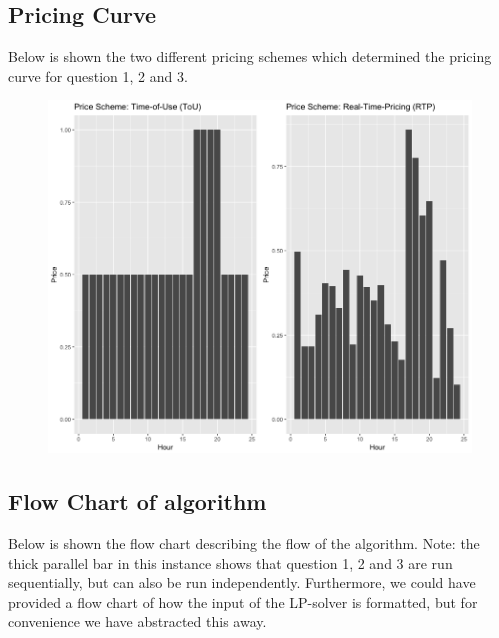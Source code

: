 \documentclass{article}
\begin{document}
	\subsection{Pricing Curve}
    Below is shown the two different pricing schemes which determined the pricing curve for question 1, 2 and 3.
    \begin{figure}[ht]
    \includegraphics[scale=0.3]{pricing_schemes.png}
    \centering
    \end{figure}

\newpage

    \subsection{Flow Chart of algorithm}
    Below is shown the flow chart describing the flow of the algorithm. Note: the thick parallel bar in this instance shows that question 1, 2 and 3 are run sequentially, but can also be run independently. Furthermore, we could have provided a flow chart of how the input of the LP-solver is formatted, but for convenience we have abstracted this away.
\end{document}
